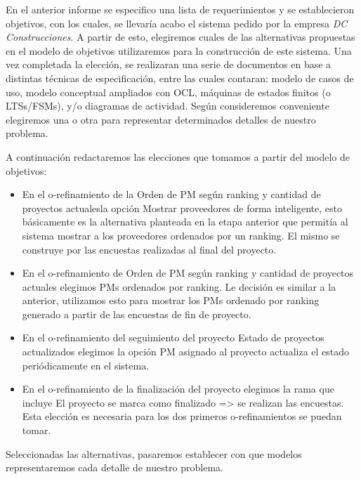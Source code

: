 En el anterior informe se especifico una lista de requerimientos y se establecieron objetivos, con los cuales,
se llevaría acabo el sistema pedido por la empresa \textit{DC Construcciones}. A partir de esto,
elegiremos cuales de las alternativas propuestas en el modelo de objetivos utilizaremos para la
construcción de este sistema. Una vez completada la elección, se realizaran una serie de documentos
en base a distintas técnicas de especificación, entre las cuales contaran: modelo de casos de uso,
modelo conceptual ampliados con OCL, máquinas de estados finitos (o LTSs/FSMs), y/o diagramas
de actividad. Según consideremos conveniente elegiremos una o otra para representar determinados
detalles de nuestro problema.

A continuación redactaremos las elecciones que tomamos a partir del modelo de objetivos:

\begin{itemize}
\item En el o-refinamiento de la Orden de PM según ranking y cantidad de proyectos actualesla opción Mostrar proveedores de forma inteligente, esto básicamente es la alternativa planteada
en la etapa anterior que permitía al sistema mostrar a los proveedores ordenados por un ranking. El mismo se construye por las encuestas realizadas al final
del proyecto.
\item En el o-refinamiento de Orden de PM según ranking y cantidad de proyectos actuales elegimos PMs ordenados por ranking. Le decisión es similar a la anterior,
utilizamos esto para mostrar los PMs ordenado por ranking generado a partir de las encuestas de fin de proyecto.
\item En el o-refinamiento del seguimiento del proyecto Estado de proyectos actualizados elegimos la opción PM asignado al proyecto
actualiza el estado periódicamente en el sistema.
\item En el o-refinamiento de la finalización del proyecto elegimos la rama que incluye El proyecto se marca como finalizado => se realizan
las encuestas. Esta elección es necesaria para los dos primeros o-refinamientos se puedan tomar.
\end{itemize}

Seleccionadas las alternativas, pasaremos establecer con que modelos representaremos cada detalle de nuestro problema.

